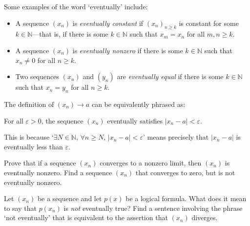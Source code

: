 \begin{example}
Some examples of the word `eventually' include:
\begin{itemize}
\item A sequence $(x_n)$ is \textit{eventually constant} if $(x_n)_{n \ge k}$ is constant for some $k \in \mathbb{N}$---that is, if there is some $k \in \mathbb{N}$ such that $x_m = x_n$ for all $m,n \ge k$.

\item A sequence $(x_n)$ is \textit{eventually nonzero} if there is some $k \in \mathbb{N}$ such that $x_n \ne 0$ for all $n \ge k$.

\item Two sequences $(x_n)$ and $(y_n)$ are \textit{eventually equal} if there is some $k \in \mathbb{N}$ such that $x_n = y_n$ for all $n \ge k$.
\end{itemize}
\end{example}

\begin{example}
\label{exConvergenceEssentially}
The definition of $(x_n) \to a$ can be equivalently phrased as:
\begin{center}
For all $\varepsilon > 0$, the sequence $(x_n)$ eventually satisfies $|x_n - a| < \varepsilon$.
\end{center}
This is because `$\exists N \in \mathbb{N},\, \forall n \ge N,\, |x_n - a| < \varepsilon$' means precisely that $|x_n - a|$ is eventually less than $\varepsilon$.
\end{example}

\begin{exercise}
Prove that if a sequence $(x_n)$ converges to a nonzero limit, then $(x_n)$ is eventually nonzero. Find a sequence $(x_n)$ that converges to zero, but is not eventually nonzero.
\end{exercise}

\begin{exercise}
Let $(x_n)$ be a sequence and let $p(x)$ be a logical formula. What does it mean to say that $p(x_n)$ is \textit{not} eventually true? Find a sentence involving the phrase `not eventually' that is equivalent to the assertion that $(x_n)$ diverges.
\end{exercise}

